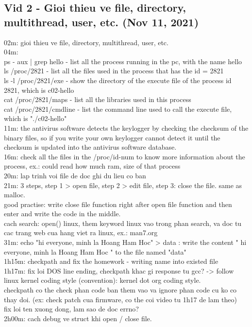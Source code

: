 \documentclass{article}
\begin{document}
\subsection{Vid 2 - Gioi thieu ve file, directory, multithread, user, etc. (Nov 11, 2021)}

02m: gioi thieu ve file, directory, multithread, user, etc.
\\04m:
\\ps - aux | grep hello - list all the process running in the pc, with the name hello
\\ls /proc/2821 - list all the files used in the process that has the id = 2821
\\ls -l /proc/2821/exe - show the directory of the execute file of the process id 2821, which is c02-hello
\\cat /proc/2821/maps - list all the libraries used in this process
\\cat /proc/2821/cmdline - list the command line used to call the execute file, which is "./c02-hello"
\\11m: the antivirus software detects the keylogger by checking the checksum of the binary files, so if you write your own keylogger cannot detect it until the checksum is updated into the antivirus software database.
\\16m: check all the files in the /proc/id-num to know more information about the process, ex.: could read how much ram, size of that process
\\20m: lap trinh voi file de doc ghi du lieu co ban
\\21m: 3 steps, step 1 > open file, step 2 > edit file, step 3: close the file. same as malloc.
\\good practise: write close file function right after open file function and then enter and write the code in the middle.
\\cach search: open() linux, them keyword linux vao trong phan search, va doc tu cac trang web cua hang viet ra linux, ex.: man7.org
\\31m: echo "hi everyone, minh la Hoang Ham Hoc" > data : write the content " hi everyone, minh la Hoang Ham Hoc " to the file named "data"
\\1h15m: checkpath and fix the homework - writing name into existed file
\\1h17m: fix loi DOS line ending, checkpath khac gi response tu gcc? -> follow linux kernel coding style (convention): kernel dot org coding style. 
\\checkpath co the check phan code ban them vao va ignore phan code cu ko co thay doi. (ex: check patch cua firmware, co the coi video tu 1h17 de lam theo)
\\fix loi ten xuong dong, lam sao de doc errno?
\\2h00m: cach debug ve struct khi open / close file.
\end{document}
